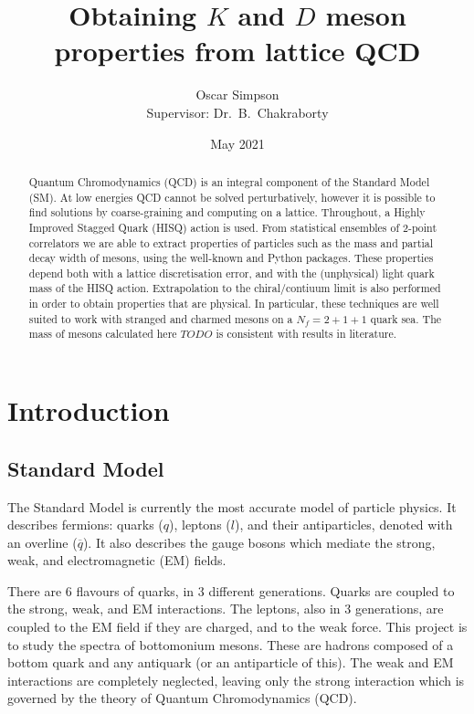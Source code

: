 \documentclass[a4paper,12pt]{article}
\title{Obtaining $K$ and $D$ meson properties from lattice QCD}
\author{Oscar Simpson \\ Supervisor: Dr.\ B.\ Chakraborty}
\date{May 2021}
\begin{document}
\maketitle
\begin{abstract}
Quantum Chromodynamics (QCD) is an integral component of the Standard Model (SM). At low energies QCD cannot be solved perturbatively, however it is possible to find solutions by coarse-graining and computing on a lattice. Throughout, a Highly Improved Stagged Quark (HISQ) action is used. From statistical ensembles of 2-point correlators we are able to extract properties of particles such as the mass and partial decay width of mesons, using the well-known  and  Python packages\cite{lepage2020corrfitter, lepage2020lsqfit}. These properties depend both with a lattice discretisation error, and with the (unphysical) light quark mass of the HISQ action. Extrapolation to the chiral/contiuum limit is also performed in order to obtain properties that are physical. In particular, these techniques are well suited to work with stranged and charmed mesons on a $N_f = 2 + 1 + 1$ quark sea. The mass of mesons calculated here $TODO$ is consistent with results in literature.
\end{abstract} 

\tableofcontents
\pagebreak

\section{Introduction}
\subsection{Standard Model}
The Standard Model is currently the most accurate model of particle physics. It describes fermions: quarks ($q$), leptons ($l$), and their antiparticles, denoted with an overline ($\overline{q}$). It also describes the gauge bosons which mediate the strong, weak, and electromagnetic (EM) fields. 

There are 6 flavours of quarks, in 3 different generations. Quarks are coupled to the strong, weak, and EM interactions. The leptons, also in 3 generations, are coupled to the EM field if they are charged, and to the weak force. This project is to study the spectra of bottomonium mesons. These are hadrons composed of a bottom quark and any antiquark (or an antiparticle of this). The weak and EM interactions are completely neglected, leaving only the strong interaction which is governed by the theory of Quantum Chromodynamics (QCD).
\end{document}
